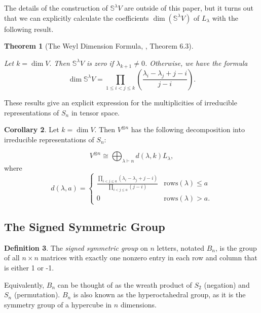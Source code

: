 \documentclass{amsart}
\theoremstyle{plain}
\newtheorem{theorem}{Theorem}[section]
\theoremstyle{definition}
\newtheorem{definition}[theorem]{Definition}
\newtheorem{corollary}[theorem]{Corollary}
\begin{document}
The details of the construction of $\mathbb{S}^{\lambda}V$ are outside of this paper, but it turns out that we can explicitly calculate the coefficients $\dim(\mathbb{S}^{\lambda}V)$ of $L_{\lambda}$ with the following result.  

\begin{theorem}[The Weyl Dimension Formula, \cite{FultonHarris}, Theorem 6.3]\label{weyldimformula}

Let $k=\dim V.$ Then \( \mathbb{S}^{\lambda}V \) is zero if \( \lambda_{k+1} \neq 0 \). Otherwise, we have the formula
\[
\dim \mathbb{S}^{\lambda}V = \prod_{1 \leq i < j \leq k} \left(\frac{\lambda_i - \lambda_j + j - i}{j - i}\right).
\]

\end{theorem}

These results give an explicit expression for the multiplicities of irreducible representations of $S_n$ in tensor space.

\begin{corollary}\label{finalschurweyl}
Let $k=\dim V$. Then $V^{\otimes n}$ has the following decomposition into irreducible representations of $S_n$:

\[	V^{\otimes n} \cong \bigoplus_{\lambda\vdash n} d(\lambda,k)L_\lambda,\]
where 
$$d(\lambda,a)=\begin{cases} \frac{\prod_{i < j \leq a} (\lambda_i - \lambda_j+j-i)}{\prod_{i<j \leq a}{(j-i)}} & \text{rows}(\lambda)\le a \\
    0 & \text{rows}(\lambda)>a.
    \end{cases}$$

\end{corollary}

\subsection{The Signed Symmetric Group}

\begin{definition}
     The \textit{signed symmetric group} on $n$ letters, notated $B_n$, is the group of all $n \times n $ matrices with exactly one nonzero entry in each row and column that is either 1 or -1. 
\end{definition}

Equivalently, $B_n$ can be thought of as the wreath product of $S_2$ (negation) and $S_n$ (permutation). $B_n$ is also known as the hyperoctahedral group, as it is the symmetry group of a hypercube in $n$ dimensions. 
\end{document}
